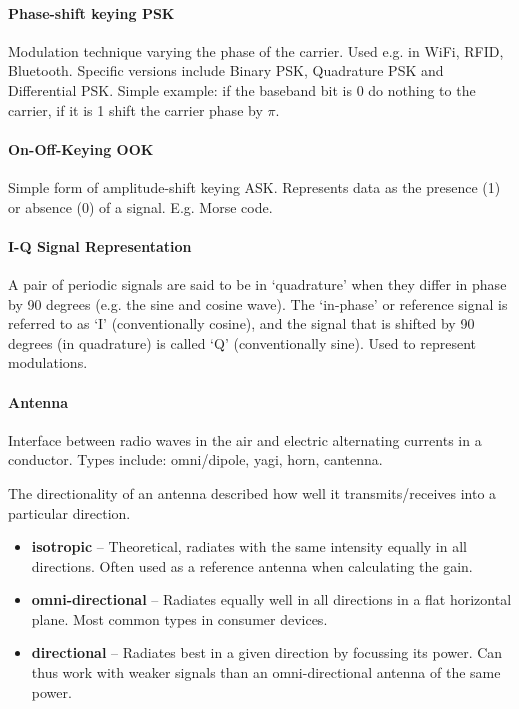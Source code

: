 \paragraph{Phase-shift keying PSK}
Modulation technique varying the phase of the carrier.
Used e.g. in WiFi, RFID, Bluetooth.
Specific versions include Binary PSK, Quadrature PSK and Differential PSK.
Simple example: if the baseband bit is 0 do nothing to the carrier, if it is 1 shift the carrier phase by $\pi$.

\paragraph{On-Off-Keying OOK}
Simple form of amplitude-shift keying ASK.
Represents data as the presence (1) or absence (0) of a signal.
E.g. Morse code.

\paragraph{I-Q Signal Representation}
A pair of periodic signals are said to be in ‘quadrature’ when they differ in phase by 90 degrees (e.g. the sine and cosine wave).
The ‘in-phase’ or reference signal is referred to as ‘I’ (conventionally cosine), and the signal that is shifted by 90 degrees (in quadrature) is called ‘Q’ (conventionally sine).
Used to represent modulations.

\paragraph{Antenna}
Interface between radio waves in the air and electric alternating currents in a conductor.
Types include: omni/dipole, yagi, horn, cantenna.

The directionality of an antenna described how well it transmits/receives into a particular direction.
\begin{itemize}
	\item \textbf{isotropic} -- Theoretical, radiates with the same intensity equally in all directions. Often used as a reference antenna when calculating the gain.
	\item \textbf{omni-directional} -- Radiates equally well in all directions in a flat horizontal plane. Most common types in consumer devices.
	\item \textbf{directional} -- Radiates best in a given direction by focussing its power. Can thus work with weaker signals than an omni-directional antenna of the same power.
\end{itemize}

